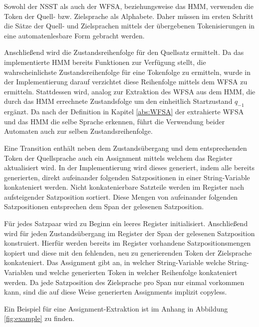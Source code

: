 \documentclass[conference]{IEEEtran}
\begin{document}
Sowohl der NSST als auch der WFSA, beziehungsweise das HMM, verwenden die Token der Quell- bzw. Zielsprache als Alphabete.
Daher müssen im ersten Schritt die Sätze der Quell- und Zielsprachen mittels der übergebenen Tokenisierungen in eine automatenlesbare Form gebracht werden.
 
Anschließend wird die Zustandsreihenfolge für den Quellsatz ermittelt.
Da das implementierte HMM bereits Funktionen zur Verfügung stellt, die wahrscheinlichste Zustandsreihenfolge für eine Tokenfolge zu ermitteln, wurde in der Implementierung darauf verzichtet diese Reihenfolge mittels dem WFSA zu ermitteln.
Stattdessen wird, analog zur Extraktion des WFSA aus dem HMM, die durch das HMM errechnete Zustandsfolge um den einheitlich Startzustand $q_{-1}$ ergänzt.
Da nach der Definition in Kapitel \ref{abs:WFSA} der extrahierte WFSA und das HMM die selbe Sprache erkennen, führt die Verwendung beider Automaten auch zur selben Zustandsreihenfolge.

Eine Transition enthält neben dem Zustandsübergang und dem entsprechenden Token der Quellsprache auch ein Assignment mittels welchem das Register aktualisiert wird.
In der Implementierung wird dieses generiert, indem alle bereits generierten, direkt aufeinander folgenden Satzpositionen in einer String-Variable konkateniert werden.
Nicht konkatenierbare Satzteile werden im Register nach aufsteigender Satzposition sortiert.
Diese Mengen von aufeinander folgenden Satzpositionen entsprechen dem Span der gelesenen Satzposition.

Für jedes Satzpaar wird zu Beginn ein leeres Register initialisiert.
Anschließend wird für jeden Zustandsübergang im Register der Span der gelesenen Satzposition konstruiert.
Hierfür werden bereits im Register vorhandene Satzpositionsmengen kopiert und diese mit den fehlenden, neu zu generierenden Token der Zielsprache konkateniert.
Das Assignment gibt an, in welcher String-Variable welche String-Variablen und welche generierten Token in welcher Reihenfolge konkateniert werden.
Da jede Satzposition des Zielsprache pro Span nur einmal vorkommen kann, sind die auf diese Weise generierten Assignments implizit copyless.

Ein Beispiel für eine Assignment-Extraktion ist im Anhang in Abbildung \ref{fig:example} zu finden.
\end{document}
